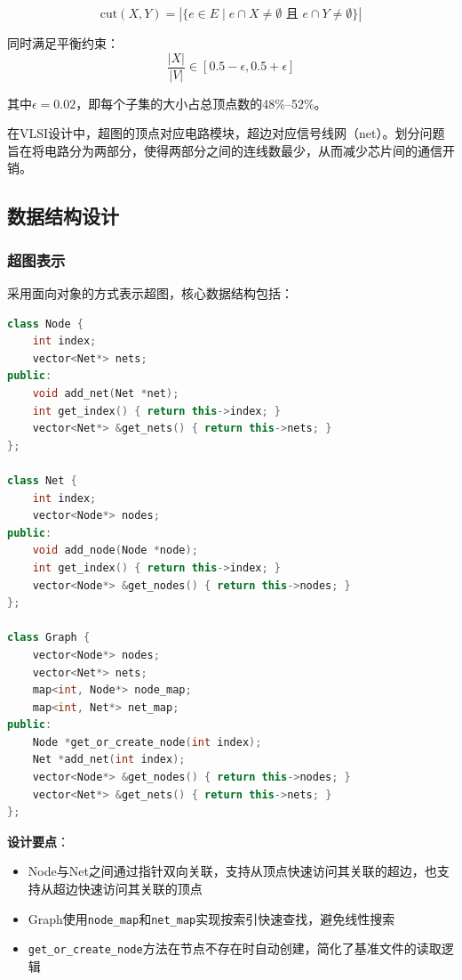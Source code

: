 \documentclass{SYSUReport}
\begin{document}
\begin{equation}
\text{cut}(X, Y) = |\{e \in E \mid e \cap X \neq \emptyset \text{ 且 } e \cap Y \neq \emptyset\}|
\end{equation}

同时满足平衡约束：
\begin{equation}
\frac{|X|}{|V|} \in [0.5 - \epsilon, 0.5 + \epsilon]
\end{equation}

其中$\epsilon = 0.02$，即每个子集的大小占总顶点数的48\%--52\%。

在VLSI设计中，超图的顶点对应电路模块，超边对应信号线网（net）。划分问题旨在将电路分为两部分，使得两部分之间的连线数最少，从而减少芯片间的通信开销。

\subsection{数据结构设计}
\subsubsection{超图表示}
采用面向对象的方式表示超图，核心数据结构包括：

\begin{lstlisting}[language=C++, caption=核心数据结构定义]
class Node {
    int index;
    vector<Net*> nets;
public:
    void add_net(Net *net);
    int get_index() { return this->index; }
    vector<Net*> &get_nets() { return this->nets; }
};

class Net {
    int index;
    vector<Node*> nodes;
public:
    void add_node(Node *node);
    int get_index() { return this->index; }
    vector<Node*> &get_nodes() { return this->nodes; }
};

class Graph {
    vector<Node*> nodes;
    vector<Net*> nets;
    map<int, Node*> node_map;
    map<int, Net*> net_map;
public:
    Node *get_or_create_node(int index);
    Net *add_net(int index);
    vector<Node*> &get_nodes() { return this->nodes; }
    vector<Net*> &get_nets() { return this->nets; }
};
\end{lstlisting}

\textbf{设计要点}：
\begin{itemize}
\item Node与Net之间通过指针双向关联，支持从顶点快速访问其关联的超边，也支持从超边快速访问其关联的顶点
\item Graph使用\texttt{node\_map}和\texttt{net\_map}实现按索引快速查找，避免线性搜索
\item \texttt{get\_or\_create\_node}方法在节点不存在时自动创建，简化了基准文件的读取逻辑
\end{itemize}
\end{document}
